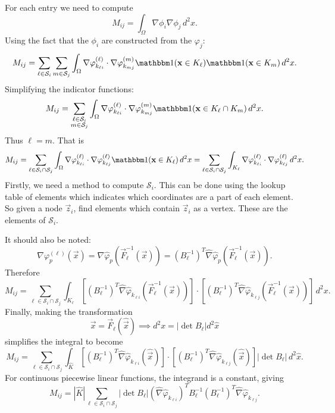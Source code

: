 \documentclass{article}
\begin{document}
For each entry we need to compute
\[
		M_{ij} = \int_\Omega \nabla \phi_i \nabla \phi_j \, d^2 x
.\] 
Using the fact that the $\phi_i$ are constructed from the $\varphi_j$:
\[
		M_{ij} = \sum_{\ell \in \mathcal S_i} \sum_{m \in \mathcal S_j}
		\int_\Omega \nabla \varphi_{k_{\ell i}}^{(\ell)} \cdot 
		\nabla \varphi_{k_{m j}}^{(m)} 
		\mathbbm 1(\vec x \in K_\ell) \mathbbm 1(\vec x \in K_m) \, d^2 x
.\] 
Simplifying the indicator functions:
\[
		M_{ij} = \sum_{\substack{\ell \in \mathcal S_i \\ 
		m \in \mathcal S_j}} \int_\Omega 
		\nabla \varphi_{k_{\ell i}}^{(\ell)} \cdot 
		\nabla \varphi_{k_{m j}}^{(m)} 
		\mathbbm 1(\vec x \in K_\ell \cap K_m) \, d^2 x
.\] 
Thus $\ell = m$.  That is
\[
		M_{ij} = \sum_{\ell \in \mathcal S_i \cap \mathcal S_j} 
		\int_\Omega \nabla \varphi_{k_{\ell i}}^{(\ell)} \cdot 
		\nabla \varphi_{k_{\ell j}}^{(\ell)} \mathbbm 1(\vec x \in K_\ell) 
		\, d^2 x = 
		\sum_{\ell \in \mathcal S_i \cap \mathcal S_j} 
		\int_{K_\ell} \nabla \varphi_{k_{\ell i}}^{(\ell)} \cdot
		\nabla \varphi_{k_{\ell j}}^{(\ell)} \, d^2 x
.\] 
Firstly, we need a method to compute $\mathcal S_i$.  
This can be done using the lookup table of elements which 
indicates which coordinates are a part of each element.  
So given a node $\vec z_i$, find elements which contain $\vec z_i$
as a vertex.  These are the elements of $\mathcal S_i$.  

It should also be noted:
\[
		\nabla \varphi_p^{(\ell)}(\vec x) = 
		\nabla \hat \varphi_p(\vec F^{-1}_\ell(\vec x)) = 
		\left(B_\ell^{-1}\right)^T 
		\hat \nabla \hat \varphi_p(\vec F^{-1}_\ell(\vec x))
.\] 
Therefore
\[
		M_{ij} = \sum_{\ell \in \mathcal S_i \cap \mathcal S_j} 
		\int_{K_\ell} \left[\left(B_\ell^{-1}\right)^T 
				\hat\nabla \hat\varphi_{k_{\ell i}}(\vec F_\ell^{-1}(\vec x))
		\right] \cdot 
		\left[\left(B_\ell^{-1}\right)^T
				\hat\nabla \hat\varphi_{k_{\ell j}}(\vec F_\ell^{-1}(\vec x))
		\right] \, d^2 x
.\] 
Finally, making the transformation
\[
		\vec x = \vec F_\ell(\hat{\vec x}) \implies 
		d^2 x = |\det B_\ell| d^2 \hat x
\] 
simplifies the integral to become
\[
		M_{ij} = \sum_{\ell \in \mathcal S_i \cap \mathcal S_j} 
		\int_{\hat K} \left[\left(B_\ell^{-1}\right)^T 
				\hat\nabla \hat\varphi_{k_{\ell i}}(\hat{\vec x})
				\right] \cdot \left[\left(B_\ell^{-1}\right)^T
		\hat\nabla \hat\varphi_{k_{\ell j}}(\hat{\vec x}) \right] 
		|\det B_\ell| \, d^2 \hat x
.\] 
For continuous piecewise linear functions, the integrand is a constant,
giving
\[
		M_{ij} = |\hat K| \sum_{\ell \in \mathcal S_i \cap \mathcal S_j} 
		|\det B_\ell| \left(\hat\nabla \hat\varphi_{k_{\ell i}}\right)^T 
		B_\ell^{-1} \left(B_\ell^{-1}\right)^T 
		\hat\nabla \hat\varphi_{k_{\ell j}}
.\] 
\end{document}
